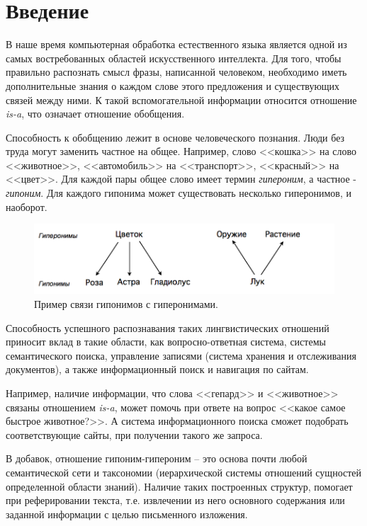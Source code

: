 \section*{Введение}
\label{sec:Introduction} 
\large 

В наше время компьютерная обработка естественного языка является одной из самых
востребованных областей искусственного интеллекта. Для того, чтобы правильно
распознать смысл фразы, написанной человеком, необходимо иметь дополнительные
знания о каждом слове этого предложения и существующих связей между ними. К такой
вспомогательной информации относится отношение \textit{is-a}, что означает отношение
обобщения.

Способность к обобщению лежит в основе человеческого познания. Люди без труда могут
заменить частное на общее. Например, слово <<кошка>> на слово <<животное>>,
<<автомобиль>> на <<транспорт>>, <<красный>> на <<цвет>>. Для каждой пары общее слово имеет
термин \textit{гипероним}, а частное - \textit{гипоним}. Для каждого гипонима может существовать
несколько гиперонимов, и наоборот.


\begin{figure}[ht]
\centering 
    \includegraphics[scale=0.6]{image/Example.png}
    \caption{Пример связи гипонимов с гиперонимами.}
    \label{srg}
\end{figure}



Способность успешного распознавания таких лингвистических отношений приносит вклад
в такие области, как вопросно-ответная система, системы семантического поиска,
управление записями (система хранения и отслеживания документов), а также
информационный поиск и навигация по сайтам.

Например, наличие информации, что слова <<гепард>> и <<животное>> связаны отношением
\textit{is-a}, может помочь при ответе на вопрос <<какое самое быстрое животное?>>. А система
информационного поиска сможет подобрать соответствующие сайты, при получении
такого же запроса.

В добавок, отношение гипоним-гипероним – это основа почти любой семантической сети и
таксономии (иерархической системы отношений сущностей определенной области
знаний). Наличие таких построенных структур, помогает при реферировании текста, т.е.
извлечении из него основного содержания или заданной информации с целью
письменного изложения.

